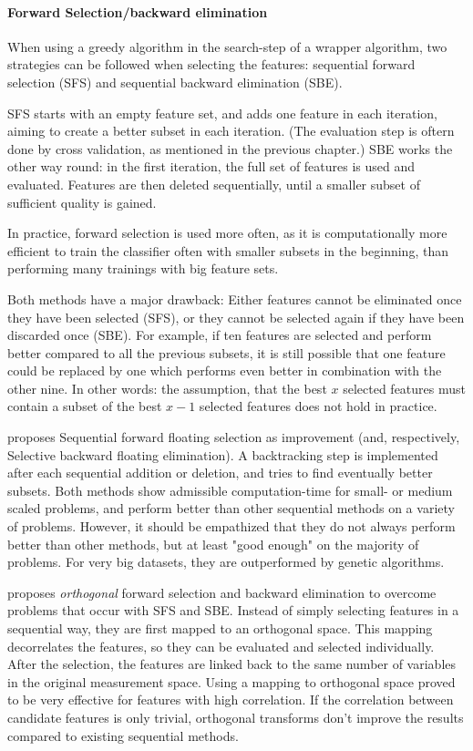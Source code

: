 \paragraph{Forward Selection/backward elimination}
\label{par:methods.flat.wrapper.forward_selection}

When using a greedy algorithm in the search-step of a wrapper algorithm, two strategies can be followed when selecting the features:
sequential forward selection (SFS) and sequential backward elimination (SBE).
 
SFS starts with an empty feature set, and adds one feature in each iteration, aiming to create a better subset in each iteration.
(The evaluation step is oftern done by cross validation, as mentioned in the previous chapter.) 
SBE works the other way round: in the first iteration, the full set of features is used and evaluated. Features are then deleted sequentially, 
until a smaller subset of sufficient quality is gained. 

In practice, forward selection is used more often, as it is computationally more efficient to train the classifier often with smaller subsets 
in the beginning, than performing many trainings with big feature sets.

Both methods have a major drawback: Either features cannot be eliminated once they have been selected (SFS), or they cannot be selected again 
if they have been discarded once (SBE). For example, if ten features are selected and perform better compared to all the previous subsets,
it is still possible that one feature could be replaced by one which performs even better in combination with the other nine. 
In other words: the assumption, that the best $x$ selected features must contain a subset of the best $x-1$ selected features does not hold in practice.
\cite{Nakariyakul:08}

\cite{Pudil:94} proposes Sequential forward floating selection as improvement (and, respectively, Selective backward floating elimination). 
A backtracking step is implemented after each sequential addition or deletion, and tries to find eventually better subsets. Both methods 
show admissible computation-time for small- or medium scaled problems, and perform better than other sequential methods on a variety of
problems. However, it should be empathized that they do not always perform better than other methods, but at least "good enough" on the 
majority of problems. For very big datasets, they are outperformed by genetic algorithms.\cite{Kudo:00}   

\cite{Mao:04} proposes \textit{orthogonal} forward selection and backward elimination to overcome problems that occur with SFS and SBE. 
Instead of simply selecting features in a sequential way, they are first mapped to an orthogonal space. 
This mapping decorrelates the features, so they can be evaluated and selected individually. 
After the selection, the features are linked back to the same number of variables in the original measurement space.
Using a mapping to orthogonal space proved to be very effective for features with high correlation. 
If the correlation between candidate features is only trivial, orthogonal transforms don't improve the results compared to existing sequential methods.